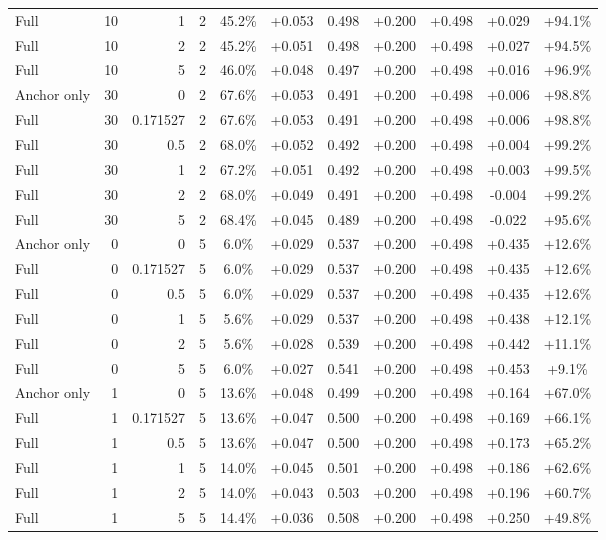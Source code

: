 \begin{table}[htbp]
\begin{tabular}{lrrrccccccc}
Full & 10 & 1 & 2 & 45.2\% & +0.053 & 0.498 & +0.200 & +0.498 & +0.029 & +94.1\% \\
Full & 10 & 2 & 2 & 45.2\% & +0.051 & 0.498 & +0.200 & +0.498 & +0.027 & +94.5\% \\
Full & 10 & 5 & 2 & 46.0\% & +0.048 & 0.497 & +0.200 & +0.498 & +0.016 & +96.9\% \\
Anchor only & 30 & 0 & 2 & 67.6\% & +0.053 & 0.491 & +0.200 & +0.498 & +0.006 & +98.8\% \\
Full & 30 & 0.171527 & 2 & 67.6\% & +0.053 & 0.491 & +0.200 & +0.498 & +0.006 & +98.8\% \\
Full & 30 & 0.5 & 2 & 68.0\% & +0.052 & 0.492 & +0.200 & +0.498 & +0.004 & +99.2\% \\
Full & 30 & 1 & 2 & 67.2\% & +0.051 & 0.492 & +0.200 & +0.498 & +0.003 & +99.5\% \\
Full & 30 & 2 & 2 & 68.0\% & +0.049 & 0.491 & +0.200 & +0.498 & -0.004 & +99.2\% \\
Full & 30 & 5 & 2 & 68.4\% & +0.045 & 0.489 & +0.200 & +0.498 & -0.022 & +95.6\% \\
Anchor only & 0 & 0 & 5 & 6.0\% & +0.029 & 0.537 & +0.200 & +0.498 & +0.435 & +12.6\% \\
Full & 0 & 0.171527 & 5 & 6.0\% & +0.029 & 0.537 & +0.200 & +0.498 & +0.435 & +12.6\% \\
Full & 0 & 0.5 & 5 & 6.0\% & +0.029 & 0.537 & +0.200 & +0.498 & +0.435 & +12.6\% \\
Full & 0 & 1 & 5 & 5.6\% & +0.029 & 0.537 & +0.200 & +0.498 & +0.438 & +12.1\% \\
Full & 0 & 2 & 5 & 5.6\% & +0.028 & 0.539 & +0.200 & +0.498 & +0.442 & +11.1\% \\
Full & 0 & 5 & 5 & 6.0\% & +0.027 & 0.541 & +0.200 & +0.498 & +0.453 & +9.1\% \\
Anchor only & 1 & 0 & 5 & 13.6\% & +0.048 & 0.499 & +0.200 & +0.498 & +0.164 & +67.0\% \\
Full & 1 & 0.171527 & 5 & 13.6\% & +0.047 & 0.500 & +0.200 & +0.498 & +0.169 & +66.1\% \\
Full & 1 & 0.5 & 5 & 13.6\% & +0.047 & 0.500 & +0.200 & +0.498 & +0.173 & +65.2\% \\
Full & 1 & 1 & 5 & 14.0\% & +0.045 & 0.501 & +0.200 & +0.498 & +0.186 & +62.6\% \\
Full & 1 & 2 & 5 & 14.0\% & +0.043 & 0.503 & +0.200 & +0.498 & +0.196 & +60.7\% \\
Full & 1 & 5 & 5 & 14.4\% & +0.036 & 0.508 & +0.200 & +0.498 & +0.250 & +49.8\% \\

\end{tabular}
\end{table}
